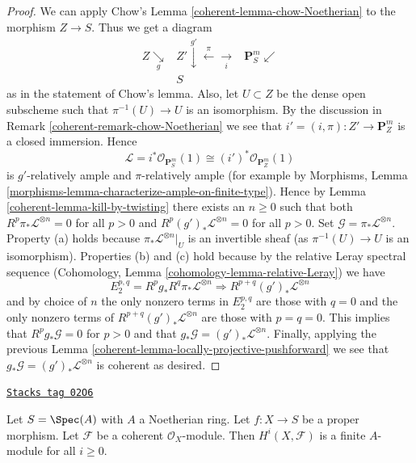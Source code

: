 \begin{proof}
\medskip\noindent
We can apply Chow's Lemma \ref{coherent-lemma-chow-Noetherian}
to the morphism $Z \to S$. Thus we get a diagram
$$
\begin{array}{ccc}Z \underset{g}{\searrow} & Z' \overset{g'}{\downarrow}\overset{\pi}{\longleftarrow}\underset{i}{\longrightarrow} & \mathbf{P}^m_S \swarrow \\  & S & \end{array}
$$
as in the statement of Chow's lemma. Also, let $U \subset Z$ be
the dense open subscheme such that $\pi^{-1}(U) \to U$ is an isomorphism.
By the discussion in Remark \ref{coherent-remark-chow-Noetherian} we see that
$i' = (i, \pi) : Z' \to \mathbf{P}^m_Z$ is
a closed immersion. Hence
$$
\mathcal{L} = i^*\mathcal{O}_{\mathbf{P}^m_S}(1) \cong
(i')^*\mathcal{O}_{\mathbf{P}^m_Z}(1)
$$
is $g'$-relatively ample and $\pi$-relatively ample (for example by
Morphisms, Lemma \ref{morphisms-lemma-characterize-ample-on-finite-type}).
Hence by Lemma \ref{coherent-lemma-kill-by-twisting}
there exists an $n \geq 0$ such that
both $R^p\pi_*\mathcal{L}^{\otimes n} = 0$ for all $p > 0$ and
$R^p(g')_*\mathcal{L}^{\otimes n} = 0$ for all $p > 0$.
Set $\mathcal{G} = \pi_*\mathcal{L}^{\otimes n}$.
Property (a) holds because $\pi_*\mathcal{L}^{\otimes n}|_U$ is
an invertible sheaf (as $\pi^{-1}(U) \to U$ is an isomorphism).
Properties (b) and (c) hold because by the relative Leray
spectral sequence
(Cohomology, Lemma \ref{cohomology-lemma-relative-Leray})
we have
$$
E_2^{p, q} = R^pg_* R^q\pi_*\mathcal{L}^{\otimes n}
\Rightarrow
R^{p + q}(g')_*\mathcal{L}^{\otimes n}
$$
and by choice of $n$ the only nonzero terms in $E_2^{p, q}$ are
those with $q = 0$ and the only nonzero terms of
$R^{p + q}(g')_*\mathcal{L}^{\otimes n}$ are those with $p = q = 0$.
This implies that $R^pg_*\mathcal{G} = 0$ for $p > 0$ and
that $g_*\mathcal{G} = (g')_*\mathcal{L}^{\otimes n}$.
Finally, applying the previous
Lemma \ref{coherent-lemma-locally-projective-pushforward}
we see that $g_*\mathcal{G} = (g')_*\mathcal{L}^{\otimes n}$ is
coherent as desired.
\end{proof}

\begin{lemma}
\label{coherent-lemma-proper-over-affine-cohomology-finite}
\href{https://stacks.math.columbia.edu/tag/02O6}{\texttt{Stacks tag 02O6}}

Let $S = \Spec(A)$ with $A$ a Noetherian ring.
Let $f : X \to S$ be a proper morphism.
Let $\mathcal{F}$ be a coherent $\mathcal{O}_X$-module.
Then $H^i(X, \mathcal{F})$ is a finite $A$-module for all $i \geq 0$.
\end{lemma}

